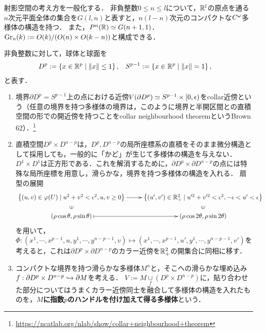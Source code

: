 \documentclass[uplatex,dvipdfmx]{jsreport}
\begin{document}
\begin{example}[Grassmann多様体]
    射影空間の考え方を一般化する．
    非負整数$0\le n\le l$について，$\mathbb{R}^l$の原点を通る$n$次元平面全体の集合を$G(l,n)$と表すと，$n(l-n)$次元のコンパクトな$C^\omega$多様体の構造を持つ．
    また，$P^n(\mathbb{R})\simeq G(n+1,1)$．
    $\mathrm{Gr}_n(k):=O(k)/(O(n)\times O(k-n))$と構成できる．
\end{example}

\begin{example}[Handlebody]
    非負整数に対して，球体と球面を
    \begin{align*}
        D^p&:=\left\{x\in\mathbb{R}^p\mid\|x\|\le 1\right\},&S^{p-1}&:=\left\{x\in\mathbb{R}^p\mid\|x\|=1\right\},
    \end{align*}
    と表す．
    \begin{enumerate}
        \item 境界$\partial D^p=S^{p-1}$上の点における近傍$V(\partial D^p)\simeq S^{p-1}\times[0,\epsilon)$をcollar近傍という（任意の境界を持つ多様体の境界は，このように境界と半開区間との直積空間の形での開近傍を持つことをcollar neighbourhood theoremというBrown 62）．\footnote{\url{https://ncatlab.org/nlab/show/collar+neighbourhood+theorem}}
        \item 直積空間$D^p\times D^{n-p}$は，$D^p,D^{n-p}$の局所座標系の直積をそのまま微分構造として採用しても，一般的に「かど」が生じて多様体の構造を与えない．$D^1\times D^1$は正方形である．これを解消するために，$\partial D^p\times\partial D^{n-p}$の点には特殊な局所座標を用意し，滑らかな，境界を持つ多様体の構造を入れる．
        扇型の展開
        \[\xymatrix@R-2pc{
            \Brace{(u,v)\in\varphi(U)\mid u^2+v^2<\ep^2,u,v\ge 0}\ar[r]&\Brace{(u',v')\in\R^2_+\mid u'^2+v'^2<\ep^2,-\ep<u'<\ep}\\
            \rotatebox[origin=c]{90}{$\in$}&\rotatebox[origin=c]{90}{$\in$}\\
            (\rho\cos\theta,\rho\sin\theta)\ar@{|->}[r]&(\rho\cos2\theta,\rho\sin2\theta)
        }\]
        を用いて，$\Phi:(x^1,\cdots,x^{p-1},u,y^1,\cdots,y^{n-p-1},v)\mapsto(x^1,\cdots,x^{p-1},u',y^1,\cdots,y^{n-p-1},v')$を考えると，これは$\partial D^p\times\partial D^{n-p}$のカラー近傍を$\mathbb{R}^2_+$の開集合に同相に移す．
        \item コンパクトな境界を持つ滑らかな多様体$M^n$と，そこへの滑らかな埋め込み$f:\partial D^p\times D^{n-p}\hookrightarrow\partial M$を考える．
        $V:=M\underset{f}{\cup}(D^p\times D^{n-p})$に，貼り合わせた部分についてはうまくカラー近傍同士を融合して多様体の構造を入れたものを，\textbf{$M$に指数$p$のハンドルを付け加えて得る多様体}という．
    \end{enumerate}
\end{example}
\end{document}
